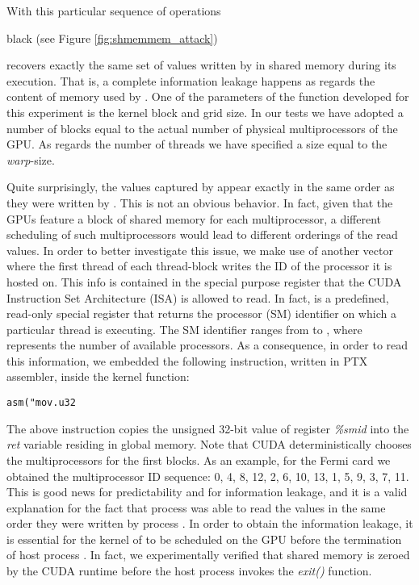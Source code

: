 \documentclass[11pt,onecolumn,letterpaper]{IEEEtran}
\newcommand{\clr}{black}
\begin{document}
With this particular sequence of operations 
\begin{color}{\clr}
(see Figure \ref{fig:shmemmem_attack})  
\end{color}
\label{leakagequantity} 
 recovers exactly the same set of values written by  in shared memory during its execution.
That is, a complete information leakage happens as regards the content of memory used by .
One of the parameters of the function developed for this experiment is the kernel block and grid size.
In our tests we have adopted a number of blocks equal to the actual number of physical multiprocessors of the GPU.
As regards the number of threads we have specified a size equal to the \textit{warp}-size.

Quite surprisingly, the values captured by  appear exactly in the same order as they were written by .
This is not an obvious behavior. 
In fact, given that the GPUs feature a block of shared memory for each multiprocessor, 
a different scheduling of such multiprocessors would lead to different orderings of the read values.
In order to better investigate this issue, we make use of another vector 
where the first thread of each thread-block writes the ID of the processor it is hosted on. This info is contained in the special purpose register  that the CUDA Instruction Set Architecture (ISA) is allowed to read.
In fact,  is a predefined, read-only special register that returns the processor (SM) identifier on which a particular thread is executing.
The SM identifier ranges from  to , where  represents the number of available processors.
As a consequence, in order to read this information, we embedded the following instruction, written in PTX assembler, inside the kernel function:
\begin{Verbatim}[frame=single]
asm("mov.u32 \end{Verbatim}
The above instruction copies the unsigned 32-bit value of register \emph{\%smid} into the \emph{ret} variable residing in global memory.
Note that CUDA deterministically chooses the multiprocessors for the first  blocks.
As an example, for the Fermi card we obtained the multiprocessor ID sequence: 0, 4, 8, 12, 2, 6, 10, 13, 1, 5, 9, 3, 7, 11.
This is good news for predictability and for information leakage, 
and it is a valid explanation for the fact that process  was able to read the values in the same order they were written by process .
In order to obtain the information leakage, it is essential for the kernel of  to be scheduled on the GPU before the termination of host process .
In fact, we experimentally verified that shared memory is zeroed by the CUDA runtime before the host process invokes the \emph{exit()} function.
\end{document}
